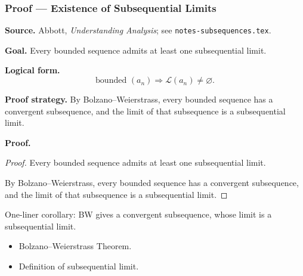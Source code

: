 
\clearpage
{}
\hypertarget{proof-RA-ABB-C-subseq-limits-exist}{}

\subsubsection[Existence of Subsequential Limits]{Proof --- Existence of Subsequential Limits}

\bigskip

\noindent
\textbf{Source.}
Abbott, \emph{Understanding Analysis}; see \texttt{notes-subsequences.tex}.

\vspace{0.75em}

\noindent
\textbf{Goal.}
Every bounded sequence admits at least one subsequential limit.

\vspace{0.75em}

\noindent
\textbf{Logical form.}
\[
  \text{bounded } (a_n) \Rightarrow \mathcal{L}(a_n) \ne \varnothing.
\]

\vspace{0.75em}

\noindent
\textbf{Proof strategy.}
By Bolzano--Weierstrass, every bounded sequence has a convergent subsequence, and the limit of that subsequence is a subsequential limit.

\vspace{0.75em}

\noindent
\textbf{Proof.}
\begin{proof}
\Claim Every bounded sequence admits at least one subsequential limit.

\Given 

\Goal 

\Strategy By Bolzano--Weierstrass, every bounded sequence has a convergent subsequence, and the limit of that subsequence is a subsequential limit.

\medskip


\end{proof}

\begin{remark*}
One-liner corollary: BW gives a convergent subsequence, whose limit is a subsequential limit.
\end{remark*}

\begin{remark*}[Dependencies]
\begin{itemize}
  \item Bolzano--Weierstrass Theorem.
  \item Definition of subsequential limit.
\end{itemize}
\end{remark*}
